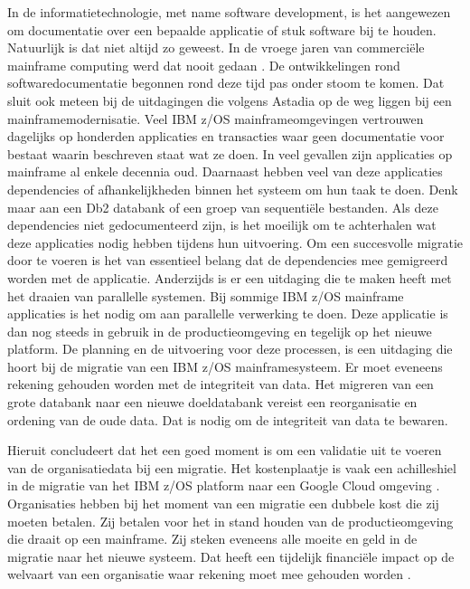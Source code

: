 In de informatietechnologie, met name software development, is het aangewezen om documentatie over een bepaalde applicatie of stuk software bij te houden. Natuurlijk is dat niet altijd zo geweest. In de vroege jaren van commerciële mainframe computing werd dat nooit gedaan  \autocite{Zachry2001}. De ontwikkelingen rond softwaredocumentatie begonnen rond deze tijd pas onder stoom te komen. Dat sluit ook meteen  bij de uitdagingen die volgens Astadia op de weg liggen bij een mainframemodernisatie. Veel IBM z/OS mainframeomgevingen vertrouwen dagelijks op honderden applicaties en transacties waar geen documentatie voor bestaat waarin beschreven staat wat ze doen. In veel gevallen zijn applicaties op mainframe al enkele decennia oud. Daarnaast hebben veel van deze applicaties dependencies of afhankelijkheden binnen het systeem om hun taak te doen. Denk maar aan een Db2 databank of een groep van sequentiële bestanden. Als deze dependencies niet gedocumenteerd zijn, is het moeilijk om te achterhalen wat deze applicaties nodig hebben tijdens hun uitvoering. Om een succesvolle migratie door te voeren is het van essentieel belang dat de dependencies mee gemigreerd worden met de applicatie. Anderzijds is er een uitdaging die te maken heeft met het draaien van parallelle systemen. Bij sommige IBM z/OS mainframe applicaties is het nodig om aan parallelle verwerking te doen. Deze applicatie is dan nog steeds in gebruik in de productieomgeving en tegelijk op het nieuwe platform. De planning en de uitvoering voor deze processen, is een uitdaging die hoort bij de migratie van een IBM z/OS mainframesysteem. Er moet eveneens rekening gehouden worden met de integriteit van data. Het migreren van een grote databank naar een nieuwe doeldatabank vereist een reorganisatie en ordening van de oude data. Dat is nodig om de integriteit van data te bewaren. 

Hieruit concludeert \textcite{Astadia2021} dat het een goed moment is om een validatie uit te voeren van de organisatiedata bij een migratie. Het kostenplaatje is vaak een achilleshiel in de migratie van het IBM z/OS platform naar een Google Cloud omgeving \autocite{Astadia2021}. Organisaties hebben bij het moment van een migratie een dubbele kost die zij moeten betalen. Zij betalen voor het in stand houden van de productieomgeving die draait op een mainframe. Zij steken eveneens alle moeite en geld in de migratie naar het nieuwe systeem. Dat heeft een tijdelijk financiële impact op de welvaart van een organisatie waar rekening moet mee gehouden worden \autocite{Astadia2021}. 

